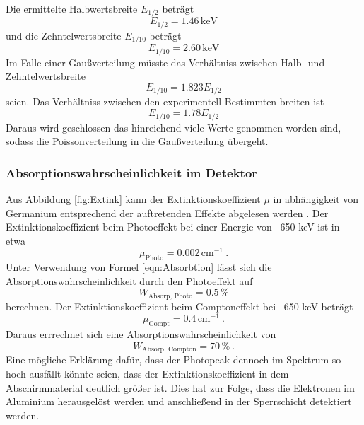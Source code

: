 Die ermittelte Halbwertsbreite $E_{1/2}$ beträgt
\begin{equation}
  E_{1/2} = 1.46 \, \text{keV}
\end{equation}
und die Zehntelwertsbreite $E_{1/10}$ beträgt
\begin{equation}
  E_{1/10} = 2.60 \, \text{keV}
\end{equation}
Im Falle einer Gaußverteilung müsste das Verhältniss zwischen Halb- und Zehntelwertsbreite
\begin{equation}
  E_{1/10} = 1.823 E_{1/2}
\end{equation}
seien. Das Verhältniss zwischen den experimentell Bestimmten breiten ist
\begin{equation}
  E_{1/10} = 1.78 E_{1/2}
  \label{eqn:Ver}
\end{equation}
Daraus wird geschlossen das hinreichend viele Werte genommen worden sind, sodass die Poissonverteilung in die Gaußverteilung übergeht.

\subsubsection{Absorptionswahrscheinlichkeit im Detektor}
Aus Abbildung \ref{fig:Extink} kann der Extinktionskoeffizient $\mu$ in abhängigkeit von Germanium entsprechend der auftretenden Effekte abgelesen werden . Der Extinktionskoeffizient beim Photoeffekt bei einer Energie von ~650 keV ist in etwa
\begin{equation}
  \mu_\text{Photo} = 0.002 \, \text{cm} ^{-1} \ .
  \label{eqn:muPhoto}
\end{equation}
Unter Verwendung von Formel \ref{eqn:Absorbtion} lässt sich die Absorptionswahrscheinlichkeit durch den Photoeffekt auf
\begin{equation}
  W_\text{Absorp, Photo} = 0.5 \, \%
  \label{eqn:AbsorpPhoto}
\end{equation}
berechnen. Der Extinktionskoeffizient beim Comptoneffekt bei ~650 keV beträgt
\begin{equation}
  \mu_\text{Compt} = 0.4 \, \text{cm} ^{-1} \ .
  \label{eqn:muCompt}
\end{equation}
Daraus errrechnet sich eine Absorptionswahrscheinlichkeit von
\begin{equation}
  W_\text{Absorp, Compton} = 70 \, \% \ .
  \label{eqn:AbsorpComp}
\end{equation}
Eine mögliche Erklärung dafür, dass der Photopeak dennoch im Spektrum so hoch ausfällt könnte seien, dass der Extinktionskoeffizient in dem Abschirmmaterial deutlich größer ist. Dies hat zur Folge, dass die Elektronen im Aluminium herausgelöst werden und anschließend in der Sperrschicht detektiert werden.

